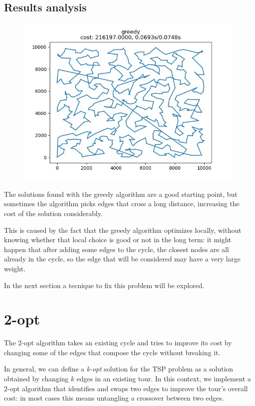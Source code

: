 \subsection{Results analysis}
\begin{figure}[h]
    \centering
    \includegraphics*[width=.6\textwidth]{../solutions/1_600_greedy.jpg}
\end{figure}

The solutions found with the greedy algorithm are a good starting point, but sometimes the algorithm picks edges that cross a long distance, increasing the cost of the solution considerably.

This is caused by the fact that the greedy algorithm optimizes locally, without knowing whether that local choice is good or not in the long term: it might happen that after adding some edges to the cycle, the closest nodes are all already in the cycle, so the edge that will be considered may have a very large weight.

In the next section a tecnique to fix this problem will be explored.

\newpage

\section{2-opt}

The 2-opt algorithm takes an existing cycle and tries to improve its cost by changing some of the edges that compose the cycle without breaking it.

In general, we can define a \textit{k-opt} solution for the TSP problem as a solution obtained by changing $k$ edges in an existing tour. In this context, we implement a 2-opt algorithm that identifies and swaps two edges to improve the tour's overall cost: in most cases this means untangling a crossover between two edges.

